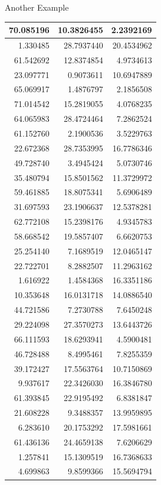 \documentclass[
  ignorenonframetext,
]{beamer}
\begin{document}
\begin{frame}{Another Example}
\begin{table}
\begin{tabular}[t]{r|r|r}
\hline
70.085196 & 10.3826455 & 2.2392169\\
\hline
1.330485 & 28.7937440 & 20.4534962\\
\hline
61.542692 & 12.8374854 & 4.9734613\\
\hline
23.097771 & 0.9073611 & 10.6947889\\
\hline
65.069917 & 1.4876797 & 2.1856508\\
\hline
71.014542 & 15.2819055 & 4.0768235\\
\hline
64.065983 & 28.4724464 & 7.2862524\\
\hline
61.152760 & 2.1900536 & 3.5229763\\
\hline
22.672368 & 28.7353995 & 16.7786346\\
\hline
49.728740 & 3.4945424 & 5.0730746\\
\hline
35.480794 & 15.8501562 & 11.3729972\\
\hline
59.461885 & 18.8075341 & 5.6906489\\
\hline
31.697593 & 23.1906637 & 12.5378281\\
\hline
62.772108 & 15.2398176 & 4.9345783\\
\hline
58.668542 & 19.5857407 & 6.6620753\\
\hline
25.254140 & 7.1689519 & 12.0465147\\
\hline
22.722701 & 8.2882507 & 11.2963162\\
\hline
1.616922 & 1.4584368 & 16.3351186\\
\hline
10.353648 & 16.0131718 & 14.0886540\\
\hline
44.721586 & 7.2730788 & 7.6450248\\
\hline
29.224098 & 27.3570273 & 13.6443726\\
\hline
66.111593 & 18.6293941 & 4.5900481\\
\hline
46.728488 & 8.4995461 & 7.8255359\\
\hline
39.172427 & 17.5563764 & 10.7150869\\
\hline
9.937617 & 22.3426030 & 16.3846780\\
\hline
61.393845 & 22.9195492 & 6.8381847\\
\hline
21.608228 & 9.3488357 & 13.9959895\\
\hline
6.283610 & 20.1753292 & 17.5981661\\
\hline
61.436136 & 24.4659138 & 7.6206629\\
\hline
1.257841 & 15.1309519 & 16.7368633\\
\hline
4.699863 & 9.8599366 & 15.5694794\\

\end{tabular}
\end{table}
\end{frame}
\end{document}
